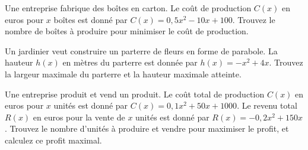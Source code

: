 \documentclass[a4paper,french]{article}
\begin{document}
\exercice{}

Une entreprise fabrique des boîtes en carton. Le coût de production \( C(x) \) en euros pour \( x \) boîtes est donné par \( C(x) = 0,5x^2 - 10x + 100 \). Trouvez le nombre de boîtes à produire pour minimiser le coût de production.

%
%
%
%
%
%
%
%
%

\exercice{}

Un jardinier veut construire un parterre de fleurs en forme de parabole. La hauteur \( h(x) \) en mètres du parterre est donnée par \( h(x) = -x^2 + 4x \). Trouvez la largeur maximale du parterre et la hauteur maximale atteinte.


Une entreprise produit et vend un produit. Le coût total de production \( C(x) \) en euros pour \( x \) unités est donné par \( C(x) = 0,1x^2 + 50x + 1000 \). Le revenu total \( R(x) \) en euros pour la vente de \( x \) unités est donné par \( R(x) = -0,2x^2 + 150x \). Trouvez le nombre d'unités à produire et vendre pour maximiser le profit, et calculez ce profit maximal.

%
%
%
%
%
\end{document}
